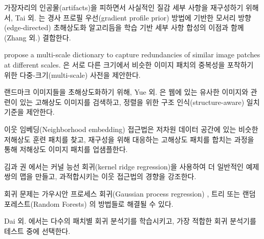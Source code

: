 \documentclass[10pt,twocolumn,letterpaper]{article}
\newcommand{\kor}[1]{#1}
\newcommand{\eng}[1]{}
\begin{document}
\eng{
To reconstruct realistic texture detail while avoiding edge artifacts, Tai et al. \cite{Tai2010} combine an edge-directed \ac{SR} algorithm based on a gradient profile prior \cite{Sun2008} with the benefits of learning-based detail synthesis. Zhang et al.
}\kor{
가장자리의 인공물(artifacts)을 피하면서 사실적인 질감 세부 사항을 재구성하기 위해서, Tai 외. \cite{Tai2010}는 경사 프로필 우선(gradient profile prior) \cite{Sun2008} 방법에 기반한 모서리 방향(edge-directed) \ac{초해상도화} 알고리듬을 학습 기반 세부 사항 합성의 이점과 함께 (Zhang 외.) 결합한다.
} \eng{
\cite{zhang2012multi} propose a multi-scale dictionary to capture redundancies of similar image patches at different scales.
}\kor{
\cite{zhang2012multi} propose a multi-scale dictionary to capture redundancies of similar image patches at different scales.
\cite{zhang2012multi}은 서로 다른 크기에서 비슷한 이미지 패치의 중복성을 포착하기 위한 다중-크기(multi-scale) 사전을 제안한다.
} %
\eng{
To super-resolve landmark images, Yue et al. \cite{Yue2013} retrieve correlating \ac{HR} images with similar content from the web and propose a structure-aware matching criterion for alignment.
}\kor{
랜드마크 이미지들을 초해상도화하기 위해, Yue 외. \cite{Yue2013}은 웹에 있는 유사한 이미지와 관련이 있는 \ac{고해상도} 이미지를 검색하고, 정렬을 위한 구조 인식(structure-aware) 일치 기준을 제안한다.
}

\eng{
Neighborhood embedding approaches upsample a \ac{LR} image patch by finding similar \ac{LR} training patches in a low dimensional manifold and combining their corresponding \ac{HR} patches for reconstruction \cite{timofte2013anchored,timofte2014a+}.
}\kor{
이웃 임베딩(Neighborhood embedding) 접근법은 저차원 데이터 공간에 있는 비슷한 \ac{저해상도} 훈련 패치를 찾고, 재구성을 위해 대응하는 \ac{고해상도} 패치를 합치는 과정\cite{timofte2013anchored,timofte2014a+}을 통해 \ac{저해상도} 이미지 패치를 업샘플한다.
}
\eng{
In Kim and Kwon \cite{Kim10kernelregression} the authors emphasize the tendency of neighborhood approaches to overfit and formulate a more general map of example pairs using kernel ridge regression.
}\kor{
김과 권 \cite{Kim10kernelregression}에서는 커널 능선 회귀(kernel ridge regression)을 사용하여 더 일반적인 예제 쌍의 맵을 만들고, 과적합시키는 이웃 접근법의 경향을 강조한다.
}
\eng{
The regression problem can also be solved with Gaussian process regression \cite{he2011single}, trees \cite{salvador2015naive} or Random Forests \cite{schulter2015fast}.
}\kor{
회귀 문제는 가우시안 프로세스 회귀(Gaussian process regression) \cite{he2011single}, 트리 \cite{salvador2015naive} 또는 랜덤 포레스트(Random Forests) \cite{schulter2015fast}의 방법들로 해결될 수 있다.
}
\eng{
In Dai et al. \cite{dai2015jointly} a multitude of patch-specific regressors is learned and the most appropriate regressors selected during testing.
}\kor{
Dai 외. \cite{dai2015jointly}에서는 다수의 패치별 회귀 분석기를 학습시키고, 가장 적합한 회귀 분석기를 테스트 중에 선택한다.
} %
\end{document}
